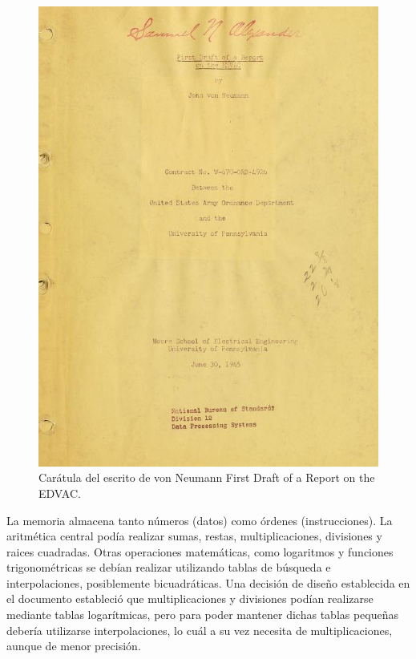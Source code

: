\begin{figure}
  \centering
  \includegraphics[scale=0.25]{./figures/C02-von_neumann_first_draft}
  \captionsetup{justification=centering}
  \caption{Carátula del escrito de von Neumann First Draft of a Report on the 
EDVAC.}
  \label{fig:C02-von_neumann_first_draft}
\end{figure}
La memoria almacena tanto números (datos) como órdenes (instrucciones).
La aritmética central podía realizar sumas, restas, multiplicaciones, divisiones
y raices cuadradas. Otras operaciones matemáticas, como logaritmos y funciones
trigonométricas se debían realizar utilizando tablas de búsqueda e
interpolaciones, posiblemente bicuadráticas. Una decisión de diseño establecida
en el documento estableció que multiplicaciones y divisiones podían realizarse
mediante tablas logarítmicas, pero para poder mantener dichas tablas pequeñas
debería utilizarse interpolaciones, lo cuál a su vez necesita de
multiplicaciones, aunque de menor precisión.\\
